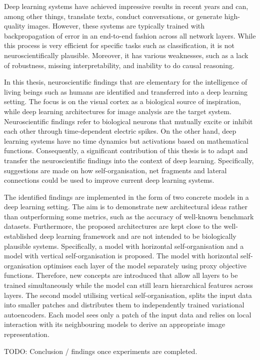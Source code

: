 Deep learning systems have achieved impressive results in recent years and can, among other things, translate texts, conduct conversations, or generate high-quality images. However, these systems are typically trained with backpropagation of error in an end-to-end fashion across all network layers. While this process is very efficient for specific tasks such as classification, it is not neuroscientifically plausible. Moreover, it has various weaknesses, such as a lack of robustness, missing interpretability, and inability to do causal reasoning.

In this thesis, neuroscientific findings that are elementary for the intelligence of living beings such as humans are identified and transferred into a deep learning setting. The focus is on the visual cortex as a biological source of inspiration, while deep learning architectures for image analysis are the target system. Neuroscientific findings refer to biological neurons that mutually excite or inhibit each other through time-dependent electric spikes. On the other hand, deep learning systems have no time dynamics but activations based on mathematical functions. Consequently, a significant contribution of this thesis is to adapt and transfer the neuroscientific findings into the context of deep learning. Specifically, suggestions are made on how self-organisation, net fragments and lateral connections could be used to improve current deep learning systems.

The identified findings are implemented in the form of two concrete models in a deep learning setting. The aim is to demonstrate new architectural ideas rather than outperforming some metrics, such as the accuracy of well-known benchmark datasets. Furthermore, the proposed architectures are kept close to the well-established deep learning framework and are not intended to be biologically plausible systems. Specifically, a model with horizontal self-organisation and a model with vertical self-organisation is proposed. The model with horizontal self-organisation optimises each layer of the model separately using proxy objective functions. Therefore, new concepts are introduced that allow all layers to be trained simultaneously while the model can still learn hierarchical features across layers. The second model utilising vertical self-organisation, splits the input data into smaller patches and distributes them to independently trained variational autoencoders. Each model sees only a patch of the input data and relies on local interaction with its neighbouring models to derive an appropriate image representation.

TODO: Conclusion / findings once experiments are completed.
